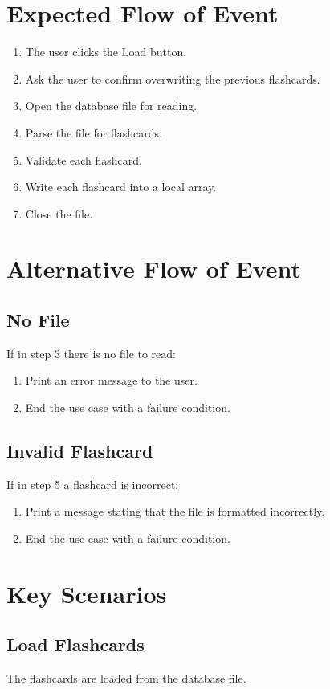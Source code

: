 \documentclass{scrreprt}
\begin{document}
\section{Expected Flow of Event}
\begin{enumerate}[1.]
    \item The user clicks the Load button.
    \item Ask the user to confirm overwriting the previous flashcards.
    \item Open the database file for reading.
    \item Parse the file for flashcards.
    \item Validate each flashcard.
    \item Write each flashcard into a local array.
    \item Close the file.
\end{enumerate}

\section{Alternative Flow of Event}

    \subsection{No File}
    If in step 3 there is no file to read:
    \begin{enumerate}
        \item Print an error message to the user.
        \item End the use case with a failure condition.
    \end{enumerate}

    \subsection{Invalid Flashcard}
    If in step 5 a flashcard is incorrect:
    \begin{enumerate}
        \item Print a message stating that the file is formatted incorrectly.
        \item End the use case with a failure condition.
    \end{enumerate}

\section{Key Scenarios}
    \subsection{Load Flashcards}
    The flashcards are loaded from the database file.
\end{document}
